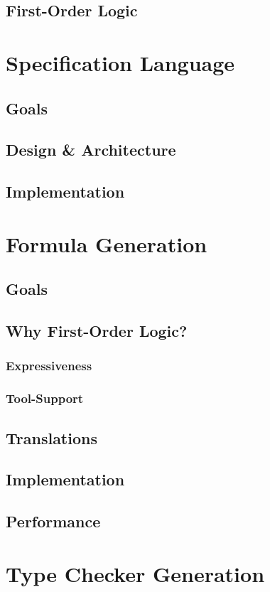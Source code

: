 \documentclass[a4paper,twoside]{report}
\begin{document}
\section{First-Order Logic}


\chapter{Specification Language}
\section{Goals}
\section{Design \& Architecture}
\section{Implementation}

\chapter{Formula Generation}
\section{Goals}
\section{Why First-Order Logic?}
\subsection{Expressiveness}
\subsection{Tool-Support}
\section{Translations}
\section{Implementation}
\section{Performance}

\chapter{Type Checker Generation}
\end{document}
